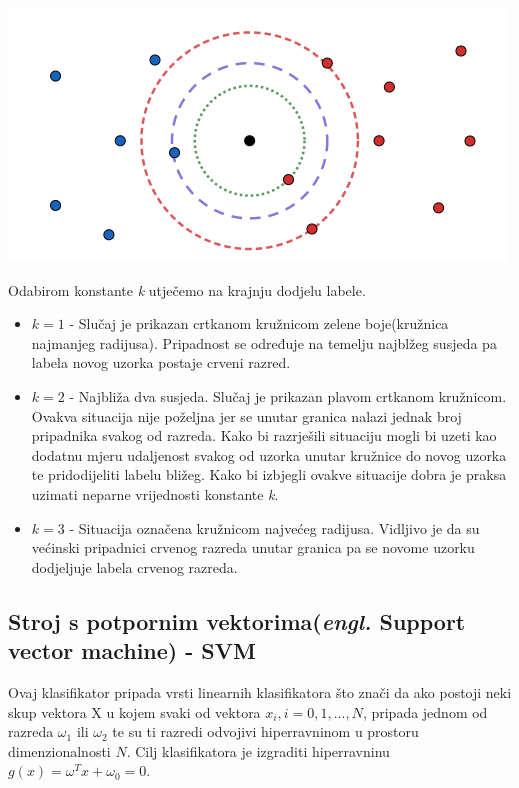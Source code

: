 \documentclass[times, utf8, zavrsni]{fer}
\begin{document}
\begin{minipage}{\linewidth}
\vspace{10pt}
\centering
\includegraphics[width=0.8\linewidth]{img/klas.png}
\end{minipage}

\bigbreak

Odabirom konstante \textit{k} utječemo na krajnju dodjelu labele.

\begin{itemize}
	\item \(k=1\) - Slučaj je prikazan crtkanom kružnicom zelene boje(kružnica najmanjeg 
	radijusa). Pripadnost se određuje na temelju najblžeg susjeda pa labela
	novog uzorka postaje crveni razred.
	\item \(k=2\) - Najbliža dva susjeda. Slučaj je prikazan plavom crtkanom kružnicom.
	Ovakva situacija nije poželjna jer se unutar granica nalazi jednak 
	broj pripadnika svakog od razreda. Kako bi razrješili situaciju mogli bi uzeti
	kao dodatnu mjeru udaljenost svakog od uzorka unutar kružnice do novog uzorka te
	pridodijeliti labelu bližeg. Kako bi izbjegli ovakve situacije dobra je praksa 
	uzimati neparne vrijednosti konstante \textit{k}.
	\item \(k=3\) - Situacija označena kružnicom najvećeg radijusa. Vidljivo
	je da su većinski pripadnici crvenog razreda unutar granica pa se
	novome uzorku dodjeljuje labela crvenog razreda.
\end{itemize}

\newpage

\subsection{Stroj s potpornim vektorima(\textit{engl.} Support vector machine) - SVM}

Ovaj klasifikator pripada vrsti linearnih klasifikatora što znači da 
ako postoji neki skup vektora X u kojem svaki od vektora \(x_i, i = 0, 1, ..., N\), 
pripada jednom od razreda \(\omega_1\) ili \(\omega_2\) te su ti razredi odvojivi hiperravninom 
u prostoru dimenzionalnosti \(N\). Cilj klasifikatora je izgraditi hiperravninu 
\(g(x) = \omega^Tx+\omega_0=0\).
\end{document}
